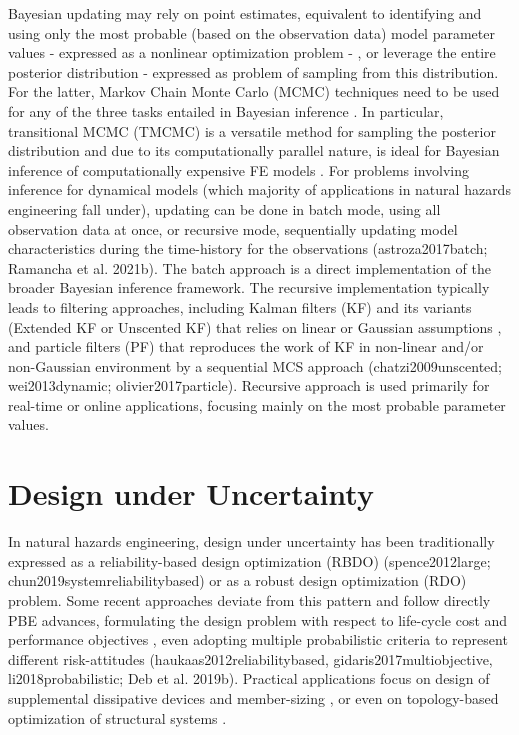 Bayesian updating may rely on point estimates, equivalent to identifying and using only the most probable (based on the observation data) model parameter values - expressed as a nonlinear optimization problem - , or leverage the entire posterior distribution - expressed as problem of sampling from this distribution. For the latter, Markov Chain Monte Carlo (MCMC) techniques need to be used for any of the three tasks entailed in Bayesian inference \citep{catanach2018bayesian}. In particular, transitional MCMC (TMCMC) is a versatile method for sampling the posterior distribution \citep{ching2007transitional,betz2016transitional} and due to its computationally parallel nature, is ideal for Bayesian inference of computationally expensive FE models \citep{ramancha2021bayesian, ramancha2021bayesianupdating}. For problems involving inference for dynamical models (which majority of applications in natural hazards engineering fall under), updating can be done in batch mode, using all observation data at once, or recursive mode, sequentially updating model characteristics during the time-history for the observations (astroza2017batch; Ramancha et al. 2021b). The batch approach is a direct implementation of the broader Bayesian inference framework. The recursive implementation typically leads to filtering approaches, including Kalman filters (KF) and its variants (Extended KF or Unscented KF) that relies on linear or Gaussian assumptions \citep{astroza2017batch,kontoroupi2017online,erazo2018bayesian}, and particle filters (PF) that reproduces the work of KF in non-linear and/or non-Gaussian environment by a sequential MCS approach (chatzi2009unscented; wei2013dynamic; olivier2017particle). Recursive approach is used primarily for real-time or online applications, focusing mainly on the most probable parameter values. 

\section{Design under Uncertainty}
\label{sec:uq_design}

In natural hazards engineering, design under uncertainty has been traditionally expressed as a reliability-based design optimization (RBDO) (spence2012large; chun2019systemreliabilitybased) or as a robust design optimization (RDO) \citep{greco2015robust} problem. Some recent approaches deviate from this pattern and follow directly PBE advances, formulating the design problem with respect to life-cycle cost and performance objectives \citep{shin2014minimum}, even adopting multiple probabilistic criteria to represent different risk-attitudes (haukaas2012reliabilitybased, gidaris2017multiobjective, li2018probabilistic; Deb et al. 2019b). Practical applications focus on design of supplemental dissipative devices \citep{shin2014minimum, gidaris2017multiobjective, altieri2018reliabilitybased} and member-sizing \citep{huang2015performancebased, suksuwan2018optimization}, or even on topology-based optimization of structural systems \citep{bobby2017reliabilitybased, zhu2017topology}.

